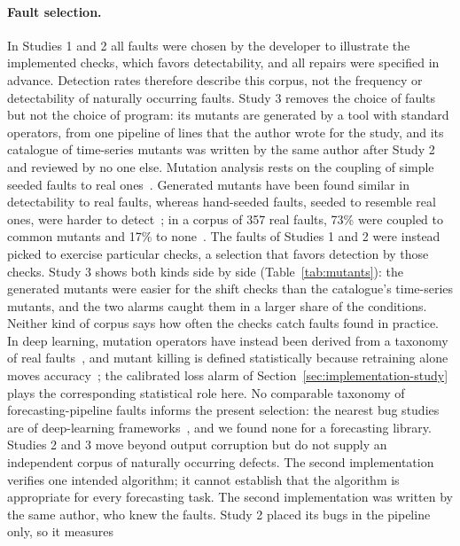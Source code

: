 \documentclass[11pt,a4paper]{article}
\begin{document}
\paragraph{Fault selection.}
In Studies 1 and 2 all faults were chosen by the developer to illustrate
the implemented checks, which favors detectability, and all repairs were
specified in advance. Detection rates therefore describe this corpus, not
the frequency or detectability of naturally occurring faults. Study 3
removes the choice of faults but not the choice of program: its mutants
are generated by a tool with standard operators, from one pipeline of
\ThirdSubjectLines{} lines that the author wrote for the study, and its
catalogue of time-series mutants was written by the same author after
Study 2 and reviewed by no one else.
Mutation analysis rests on the coupling of simple seeded faults to real
ones~\cite{jia2011analysis}. Generated mutants have been found similar
in detectability to real faults, whereas hand-seeded faults, seeded to
resemble real ones, were harder to detect~\cite{andrews2005mutation}; in a
corpus of 357 real faults, 73\% were coupled to common mutants and 17\% to
none~\cite{just2014mutants}. The faults of Studies 1 and 2 were instead
picked to exercise particular checks, a selection that favors detection by
those checks. Study 3 shows both kinds side by side
(Table~\ref{tab:mutants}): the generated mutants were easier for the shift
checks than the catalogue's time-series mutants, and the two alarms caught
them in a larger share of the conditions.
Neither kind of corpus says how often the checks catch faults found in
practice. In deep learning, mutation operators have instead been
derived from a taxonomy of real
faults~\cite{humbatova2020taxonomy,humbatova2021deepcrime}, and mutant
killing is defined statistically because retraining alone moves accuracy~\cite{jahangirova2020empirical}; the calibrated loss alarm
of Section~\ref{sec:implementation-study} plays the corresponding
statistical role here. No comparable taxonomy of forecasting-pipeline
faults informs the present selection: the nearest bug studies are of
deep-learning frameworks~\cite{tambon2024silent,chen2023toward}, and we
found none for a forecasting library.
Studies 2 and 3 move beyond output corruption but do not supply an
independent corpus of naturally occurring defects. The second implementation verifies
one intended algorithm; it cannot establish that the algorithm is
appropriate for every forecasting task. The second implementation was written by the same author, who knew the
faults. Study 2 placed its bugs in the pipeline only, so it measures
\end{document}
